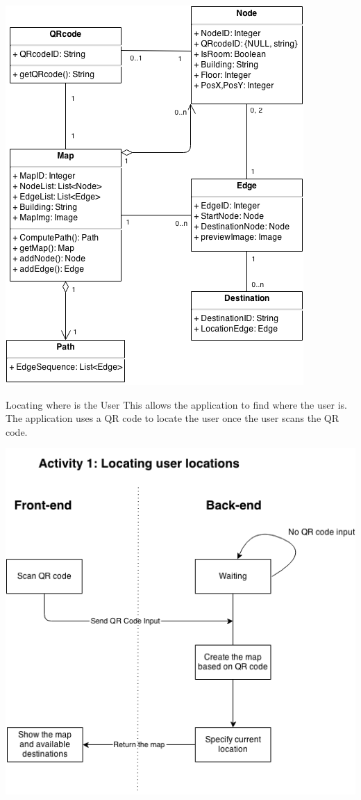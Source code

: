 \documentclass[12pt]{article}
\begin{document}
\begin{center}
\includegraphics[scale=0.6]{image/image01.png}
\end{center}

\newpage
Locating where is the User
This allows the application to find where the user is. The application uses a QR code to locate the user once the user scans the QR code.

\begin{center}
\includegraphics[scale=0.6]{image/image00.png}
\end{center}
\end{document}
